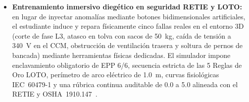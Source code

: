 \begin{itemize}
\item \textbf{Entrenamiento inmersivo diegético en seguridad RETIE y LOTO:} en lugar de inyectar anomalías mediante botones bidimensionales artificiales, el estudiante induce y repara físicamente cinco fallas reales en el entorno 3D (corte de fase L3, atasco en tolva con sacos de \qty{50}{\kilo\gram}, caída de tensión a \qty{340}{\volt} en el CCM, obstrucción de ventilación trasera y soltura de pernos de bancada) mediante herramientas físicas dedicadas. El simulador impone enclavamiento obligatorio de EPP 6/6, secuencia estricta de las 5 Reglas de Oro LOTO, perímetro de arco eléctrico de \qty{1.0}{\meter}, curvas fisiológicas IEC~60479-1 y una rúbrica continua auditable de \num{0.0} a \num{5.0} alineada con el RETIE y OSHA~1910.147~\cite{RETIE2026,OSHA1910,IEC60479}.
\end{itemize}
